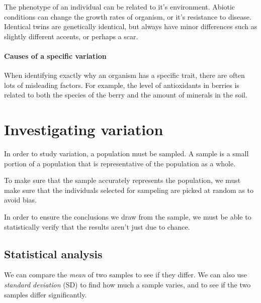 \documentclass{article}
\begin{document}
The phenotype of an individual can be related to it's environment. Abiotic
conditions can change the growth rates of organism, or it's resistance to
disease. Identical twins are genetically identical, but always have minor
differences such as slightly different accents, or perhaps a scar.

\paragraph*{Causes of a specific variation}

When identifying exactly why an organism has a specific trait, there are often
lots of misleading factors. For example, the level of antioxidants in berries is
related to both the species of the berry and the amount of minerals in the soil.

\section*{Investigating variation}

In order to study variation, a population must be sampled. A sample is a small
portion of a population that is representative of the population as a whole.

To make sure that the sample accurately represents the population, we must make
sure that the individuals selected for sampeling are picked at random as to
avoid bias.

In order to ensure the conclusions we draw from the sample, we must be able to
statistically verify that the results aren't just due to chance.

\subsection*{Statistical analysis}


We can compare the {\it mean} of two samples to see if they differ. We can also
use {\it standard deviation} (SD) to find how much a sample varies, and to see
if the two samples differ significantly.
\end{document}

